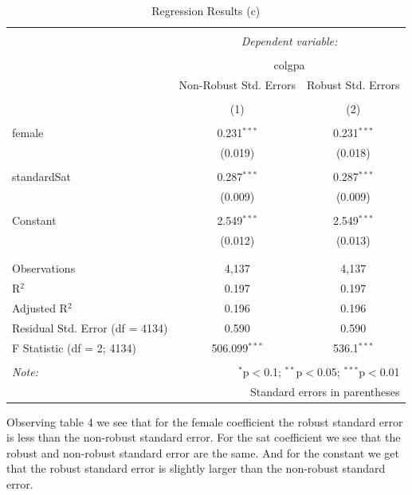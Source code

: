 \documentclass[
  12pt,
  landscape]{article}
\begin{document}
\begin{table}[H] \centering 
  \caption{Regression Results (c)} 
  \label{} 
\begin{tabular}{@{\extracolsep{5pt}}lcc} 
\\[-1.8ex]\hline 
\hline \\[-1.8ex] 
 & \multicolumn{2}{c}{\textit{Dependent variable:}} \\ 
\cline{2-3} 
\\[-1.8ex] & \multicolumn{2}{c}{colgpa} \\ 
 & Non-Robust Std. Errors & Robust Std. Errors \\ 
\\[-1.8ex] & (1) & (2)\\ 
\hline \\[-1.8ex] 
 female & 0.231$^{***}$ & 0.231$^{***}$ \\ 
  & (0.019) & (0.018) \\ 
  & & \\ 
 standardSat & 0.287$^{***}$ & 0.287$^{***}$ \\ 
  & (0.009) & (0.009) \\ 
  & & \\ 
 Constant & 2.549$^{***}$ & 2.549$^{***}$ \\ 
  & (0.012) & (0.013) \\ 
  & & \\ 
\hline \\[-1.8ex] 
Observations & 4,137 & 4,137 \\ 
R$^{2}$ & 0.197 & 0.197 \\ 
Adjusted R$^{2}$ & 0.196 & 0.196 \\ 
Residual Std. Error (df = 4134) & 0.590 & 0.590 \\ 
F Statistic (df = 2; 4134) & 506.099$^{***}$ & 536.1$^{***}$ \\ 
\hline 
\hline \\[-1.8ex] 
\textit{Note:}  & \multicolumn{2}{r}{$^{*}$p$<$0.1; $^{**}$p$<$0.05; $^{***}$p$<$0.01} \\ 
 & \multicolumn{2}{r}{Standard errors in parentheses} \\ 
\end{tabular} 
\end{table}

Observing table 4 we see that for the female coefficient the robust
standard error is less than the non-robust standard error. For the sat
coefficient we see that the robust and non-robust standard error are the
same. And for the constant we get that the robust standard error is
slightly larger than the non-robust standard error.
\end{document}
